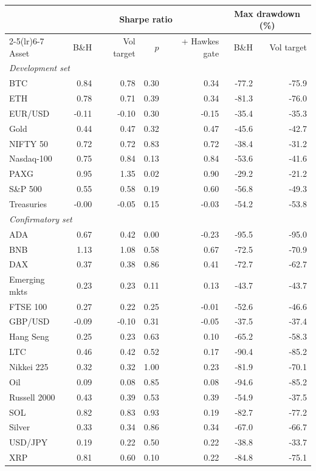\begin{tabular}{lrrrrrr}
\toprule
& \multicolumn{4}{c}{Sharpe ratio} & \multicolumn{2}{c}{Max drawdown (\%)} \\
\cmidrule(lr){2-5}\cmidrule(lr){6-7}
Asset & B\&H & Vol target & $p$ & + Hawkes gate & B\&H & Vol target \\
\midrule
\multicolumn{7}{l}{\textit{Development set}}\\
BTC & 0.84 & 0.78 & 0.30 & 0.34 & -77.2 & -75.9\\
ETH & 0.78 & 0.71 & 0.39 & 0.34 & -81.3 & -76.0\\
EUR/USD & -0.11 & -0.10 & 0.30 & -0.15 & -35.4 & -35.3\\
Gold & 0.44 & 0.47 & 0.32 & 0.47 & -45.6 & -42.7\\
NIFTY 50 & 0.72 & 0.72 & 0.83 & 0.72 & -38.4 & -31.2\\
Nasdaq-100 & 0.75 & 0.84 & 0.13 & 0.84 & -53.6 & -41.6\\
PAXG & 0.95 & 1.35 & 0.02 & 0.90 & -29.2 & -21.2\\
S\&P 500 & 0.55 & 0.58 & 0.19 & 0.60 & -56.8 & -49.3\\
Treasuries & -0.00 & -0.05 & 0.15 & -0.03 & -54.2 & -53.8\\
\midrule
\multicolumn{7}{l}{\textit{Confirmatory set}}\\
ADA & 0.67 & 0.42 & 0.00 & -0.23 & -95.5 & -95.0\\
BNB & 1.13 & 1.08 & 0.58 & 0.67 & -72.5 & -70.9\\
DAX & 0.37 & 0.38 & 0.86 & 0.41 & -72.7 & -62.7\\
Emerging mkts & 0.23 & 0.23 & 0.11 & 0.13 & -43.7 & -43.7\\
FTSE 100 & 0.27 & 0.22 & 0.25 & -0.01 & -52.6 & -46.6\\
GBP/USD & -0.09 & -0.10 & 0.31 & -0.05 & -37.5 & -37.4\\
Hang Seng & 0.25 & 0.23 & 0.63 & 0.10 & -65.2 & -58.3\\
LTC & 0.46 & 0.42 & 0.52 & 0.17 & -90.4 & -85.2\\
Nikkei 225 & 0.32 & 0.32 & 1.00 & 0.23 & -81.9 & -70.1\\
Oil & 0.09 & 0.08 & 0.85 & 0.08 & -94.6 & -85.2\\
Russell 2000 & 0.43 & 0.39 & 0.53 & 0.39 & -54.9 & -37.5\\
SOL & 0.82 & 0.83 & 0.93 & 0.19 & -82.7 & -77.2\\
Silver & 0.33 & 0.34 & 0.86 & 0.34 & -67.0 & -66.7\\
USD/JPY & 0.19 & 0.22 & 0.50 & 0.22 & -38.8 & -33.7\\
XRP & 0.81 & 0.60 & 0.10 & 0.22 & -84.8 & -75.1\\
\bottomrule
\end{tabular}
